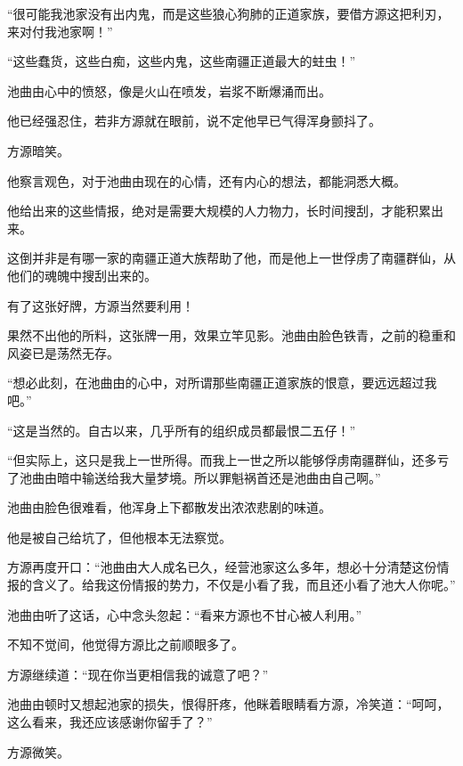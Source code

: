 \begin{this_body}
“很可能我池家没有出内鬼，而是这些狼心狗肺的正道家族，要借方源这把利刃，来对付我池家啊！”

“这些蠢货，这些白痴，这些内鬼，这些南疆正道最大的蛀虫！”

池曲由心中的愤怒，像是火山在喷发，岩浆不断爆涌而出。

他已经强忍住，若非方源就在眼前，说不定他早已气得浑身颤抖了。

方源暗笑。

他察言观色，对于池曲由现在的心情，还有内心的想法，都能洞悉大概。

他给出来的这些情报，绝对是需要大规模的人力物力，长时间搜刮，才能积累出来。

这倒并非是有哪一家的南疆正道大族帮助了他，而是他上一世俘虏了南疆群仙，从他们的魂魄中搜刮出来的。

有了这张好牌，方源当然要利用！

果然不出他的所料，这张牌一用，效果立竿见影。池曲由脸色铁青，之前的稳重和风姿已是荡然无存。

“想必此刻，在池曲由的心中，对所谓那些南疆正道家族的恨意，要远远超过我吧。”

“这是当然的。自古以来，几乎所有的组织成员都最恨二五仔！”

“但实际上，这只是我上一世所得。而我上一世之所以能够俘虏南疆群仙，还多亏了池曲由暗中输送给我大量梦境。所以罪魁祸首还是池曲由自己啊。”

池曲由脸色很难看，他浑身上下都散发出浓浓悲剧的味道。

他是被自己给坑了，但他根本无法察觉。

方源再度开口：“池曲由大人成名已久，经营池家这么多年，想必十分清楚这份情报的含义了。给我这份情报的势力，不仅是小看了我，而且还小看了池大人你呢。”

池曲由听了这话，心中念头忽起：“看来方源也不甘心被人利用。”

不知不觉间，他觉得方源比之前顺眼多了。

方源继续道：“现在你当更相信我的诚意了吧？”

池曲由顿时又想起池家的损失，恨得肝疼，他眯着眼睛看方源，冷笑道：“呵呵，这么看来，我还应该感谢你留手了？”

方源微笑。

\end{this_body}


